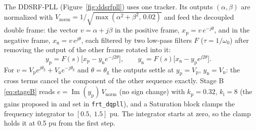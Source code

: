\documentclass[11pt,a4paper]{scrartcl}
\newcommand{\ped}[1]{_{\mathrm{#1}}}
\newcommand{\code}[1]{\texttt{#1}}
\begin{document}
\begin{onehalfspace}
The DDSRF-PLL (Figure~\ref{fig:ddsrfpll}) uses one tracker. Its outputs $(\alpha, \beta)$ are normalized with $V\ped{norm} = 1/\sqrt{\max(\alpha^2 + \beta^2,\, 0.02)}$ and feed the decoupled double frame: the vector $v = \alpha + j\beta$ in the positive frame, $x\ped{p} = v\,e^{-j\theta}$, and in the negative frame, $x\ped{n} = v\,e^{j\theta}$, each filtered by two low-pass filters $F$ ($\tau = 1/\omega_0$) after removing the output of the other frame rotated into it:
\begin{equation}
	y\ped{p} = F(s)\big[x\ped{p} - y\ped{n} e^{-j2\theta}\big], \qquad y\ped{n} = F(s)\big[x\ped{n} - y\ped{p} e^{j2\theta}\big].
	\label{eq:ddsrf}
\end{equation}
For $v = V\ped{p}e^{j\theta\ped{g}} + V\ped{n}e^{-j\theta\ped{g}}$ and $\theta = \theta\ped{g}$ the outputs settle at $y\ped{p} = V\ped{p}$, $y\ped{n} = V\ped{n}$: the cross terms cancel the component of the other sequence exactly. Stage B \eqref{eq:stageB} reads $e = \operatorname{Im}(y\ped{p})\,V\ped{norm}$ (no sign change) with $k\ped{p} = 0.32$, $k\ped{i} = 8$ (the gains proposed in \cite{note_3ph} and set in \code{frt\_dqpll}), and a Saturation block clamps the frequency integrator to $[0.5,\ 1.5]$ pu. The integrator starts at zero, so the clamp holds it at \num{0.5} pu from the first step.


\end{onehalfspace}
\end{document}
